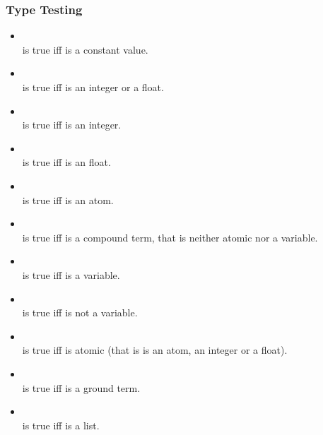 \subsubsection{Type Testing}
%
\begin{itemize}
    \item {}\\
    \noindent{} is true iff  is a constant value.\\
    \item {}\\
    \noindent{} is true iff  is an integer or a float.\\
    \item {}\\
    \noindent{} is true iff  is an integer.\\
    \item {}\\
    \noindent{} is true iff  is an float.\\
    \item {}\\
    \noindent{} is true iff  is an atom.\\
    \item {}\\
    \noindent{} is true iff  is a compound term,
    that is neither atomic nor a variable.\\
    \item {}\\
    \noindent{} is true iff  is a variable.\\
    \item {}\\
    \noindent{} is true iff  is not a variable.\\
    \item {}\\
    \noindent{} is true iff  is atomic (that is is an atom, an integer
    or a float).\\
    \item {}\\
    \noindent{} is true iff  is a ground term.\\
    \item {}\\
    \noindent{} is true iff  is a list.\\
\end{itemize}

